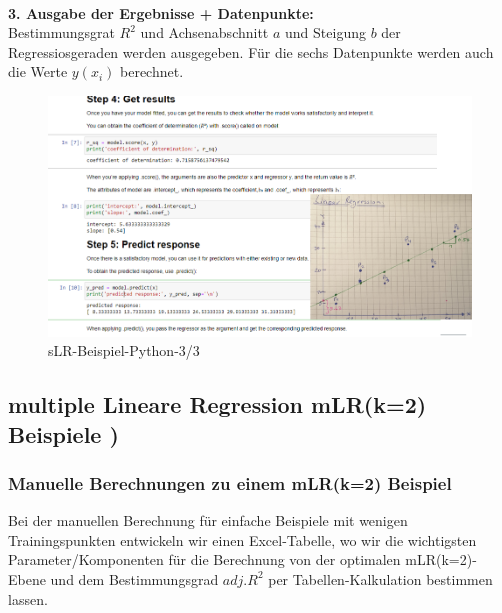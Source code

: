 \documentclass[12pt]{article}
\begin{document}
%
\\[1.2cm]
\hspace*{0.5cm} \textbf{3. Ausgabe der Ergebnisse + Datenpunkte:}\\
Bestimmungsgrat $R^2$ und Achsenabschnitt $a$ und Steigung $b$ der Regressiosgeraden werden ausgegeben. Für die sechs Datenpunkte werden auch die Werte $ y(x_i)$ berechnet. 
\begin{figure}[htp]
  \centering
  \hspace*{-0.8cm} 
  \includegraphics[width=1.2\textwidth]{sLR_Beispiel_Scikit-Learn-03}
  \caption{sLR-Beispiel-Python-3/3}
  \label{fig:sLR-SciKit-Learn02}
\end{figure}
\newpage

\subsection{multiple Lineare Regression mLR(k=2) Beispiele )}

\subsubsection{Manuelle Berechnungen zu einem mLR(k=2) Beispiel}
%
Bei der manuellen Berechnung für einfache Beispiele mit wenigen  Trainingspunkten entwickeln wir einen Excel-Tabelle, wo wir die wichtigsten Parameter/Komponenten für die Berechnung von der optimalen mLR(k=2)-Ebene und dem Bestimmungsgrad $adj.R^2$ per Tabellen-Kalkulation bestimmen lassen.\\
\end{document}

